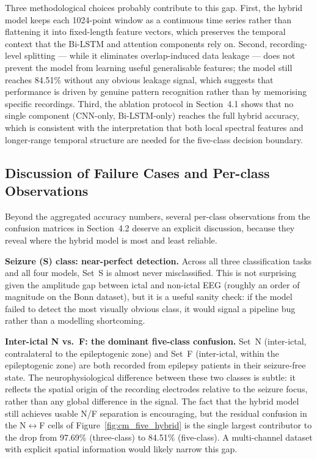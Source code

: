 Three methodological choices probably contribute to this gap. First, the hybrid model keeps each 1024-point window as a continuous time series rather than flattening it into fixed-length feature vectors, which preserves the temporal context that the Bi-LSTM and attention components rely on. Second, recording-level splitting --- while it eliminates overlap-induced data leakage --- does not prevent the model from learning useful generalisable features; the model still reaches 84.51\% without any obvious leakage signal, which suggests that performance is driven by genuine pattern recognition rather than by memorising specific recordings. Third, the ablation protocol in Section~4.1 shows that no single component (CNN-only, Bi-LSTM-only) reaches the full hybrid accuracy, which is consistent with the interpretation that both local spectral features and longer-range temporal structure are needed for the five-class decision boundary.

\subsection{Discussion of Failure Cases and Per-class Observations}

Beyond the aggregated accuracy numbers, several per-class observations from the confusion matrices in Section~4.2 deserve an explicit discussion, because they reveal where the hybrid model is most and least reliable.

\textbf{Seizure (S) class: near-perfect detection.} Across all three classification tasks and all four models, Set~S is almost never misclassified. This is not surprising given the amplitude gap between ictal and non-ictal EEG (roughly an order of magnitude on the Bonn dataset), but it is a useful sanity check: if the model failed to detect the most visually obvious class, it would signal a pipeline bug rather than a modelling shortcoming.

\textbf{Inter-ictal N vs.\ F: the dominant five-class confusion.} Set~N (inter-ictal, contralateral to the epileptogenic zone) and Set~F (inter-ictal, within the epileptogenic zone) are both recorded from epilepsy patients in their seizure-free state. The neurophysiological difference between these two classes is subtle: it reflects the spatial origin of the recording electrodes relative to the seizure focus, rather than any global difference in the signal. The fact that the hybrid model still achieves usable N/F separation is encouraging, but the residual confusion in the N$\leftrightarrow$F cells of Figure~\ref{fig:cm_five_hybrid} is the single largest contributor to the drop from 97.69\% (three-class) to 84.51\% (five-class). A multi-channel dataset with explicit spatial information would likely narrow this gap.

